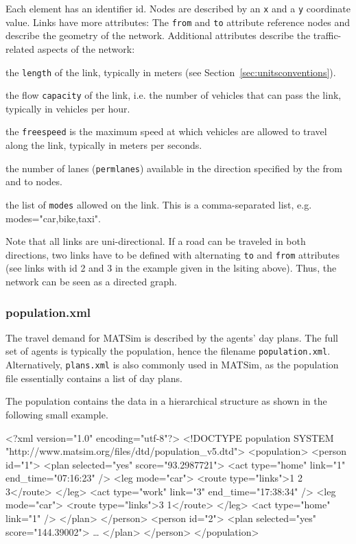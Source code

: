 Each element has an identifier id. Nodes are described by an \lstinline|x| and a \lstinline|y| coordinate value. Links have more attributes: The \lstinline|from| and \lstinline|to| attribute reference nodes and describe the geometry of the network. Additional attributes describe the traffic-related aspects of the network:
\begin{compactitem}
    \item the \lstinline|length| of the link, typically in meters (see Section~\ref{sec:unitsconventions}).
    \item the flow \lstinline|capacity| of the link, i.e. the number of vehicles that can pass the link, typically in vehicles per hour.
    \item the \lstinline|freespeed| is the maximum speed at which vehicles are allowed to travel along the link, typically in meters per seconds.
    \item the number of lanes (\lstinline|permlanes|) available in the direction specified by the from and to nodes.
    \item the list of \lstinline|modes| allowed on the link. This is a comma-separated list, e.g. modes="car,bike,taxi".
\end{compactitem}
Note that all links are uni-directional. If a road can be traveled in both directions, two links have to be defined with alternating \lstinline|to| and \lstinline|from| attributes (see links with id 2 and 3 in the example given in the lsiting above). Thus, the network can be seen as a directed graph. 

\subsubsection{population.xml}
The travel demand for MATSim is described by the agents' day plans. The full set of agents is typically the population, hence the filename \lstinline|population.xml|. Alternatively, \lstinline|plans.xml| is also commonly used in MATSim, as the population file essentially contains a list of day plans.

The population contains the data in a hierarchical structure as shown in the following small example.

\begin{xml}
<?xml version="1.0" encoding="utf-8"?> 
<!DOCTYPE population SYSTEM "http://www.matsim.org/files/dtd/population_v5.dtd"> 
<population> 
   <person id="1"> 
      <plan selected="yes" score="93.2987721"> 
         <act type="home" link="1" end_time="07:16:23" /> 
         <leg mode="car"> 
            <route type="links">1 2 3</route> 
         </leg> 
         <act type="work" link="3" end_time="17:38:34" /> 
         <leg mode="car"> 
            <route type="links">3 1</route> 
         </leg> 
         <act type="home" link="1" /> 
      </plan> 
   </person> 
   <person id="2"> 
      <plan selected="yes" score="144.39002"> 
         \ldots 
      </plan> 
   </person> 
</population>
\end{xml}


